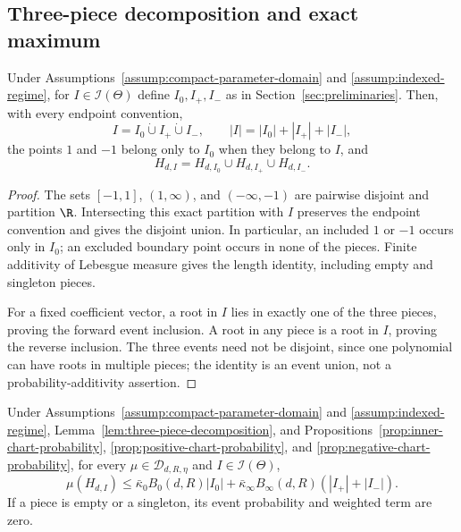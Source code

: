 \subsection{Three-piece decomposition and exact maximum}
\label{app:three-piece}

\begin{lemma}
\label{lem:three-piece-decomposition}
Under Assumptions~\ref{assump:compact-parameter-domain} and
\ref{assump:indexed-regime}, for $I\in\mathcal I(\Theta)$ define
$I_0,I_+,I_-$ as in Section~\ref{sec:preliminaries}.  Then, with every
endpoint convention,
\[
I=I_0\mathbin{\dot\cup}I_+\mathbin{\dot\cup}I_-,
\qquad
|I|=|I_0|+|I_+|+|I_-|,
\]
the points $1$ and $-1$ belong only to $I_0$ when they belong to $I$, and
\[
H_{d,I}=H_{d,I_0}\cup H_{d,I_+}\cup H_{d,I_-}.
\]
\end{lemma}

\begin{proof}
The sets $[-1,1]$, $(1,\infty)$, and $(-\infty,-1)$ are pairwise disjoint
and partition $\R$.  Intersecting this exact partition with $I$ preserves
the endpoint convention and gives the disjoint union.  In particular, an
included $1$ or $-1$ occurs only in $I_0$; an excluded boundary point occurs
in none of the pieces.  Finite additivity of Lebesgue measure gives the
length identity, including empty and singleton pieces.

For a fixed coefficient vector, a root in $I$ lies in exactly one of the
three pieces, proving the forward event inclusion.  A root in any piece is a
root in $I$, proving the reverse inclusion.  The three events need not be
disjoint, since one polynomial can have roots in multiple pieces; the identity
is an event union, not a probability-additivity assertion.
\end{proof}

\begin{proposition}
\label{prop:weighted-chart-bound}
Under Assumptions~\ref{assump:compact-parameter-domain} and
\ref{assump:indexed-regime}, Lemma~\ref{lem:three-piece-decomposition}, and
Propositions~\ref{prop:inner-chart-probability},
\ref{prop:positive-chart-probability}, and
\ref{prop:negative-chart-probability}, for every
$\mu\in\mathcal D_{d,R,\eta}$ and $I\in\mathcal I(\Theta)$,
\[
\mu(H_{d,I})
\leq\bar\kappa_0B_0(d,R)|I_0|
 +\bar\kappa_\infty B_\infty(d,R)(|I_+|+|I_-|).
\]
If a piece is empty or a singleton, its event probability and weighted term
are zero.
\end{proposition}

